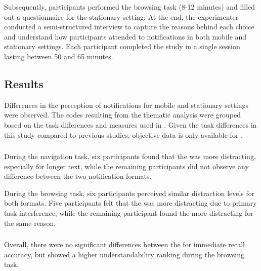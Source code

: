 Subsequently, participants performed the browsing task (8-12 minutes) and filled out a questionnaire for the stationary setting. At the end, the experimenter conducted a semi-structured interview to capture the reasons behind each choice and understand how participants attended to notifications in both mobile and stationary settings. Each participant completed the study in a single session lasting between 50 and 65 minutes.


\subsection{Results}
\label{sec:IconNotif:study4:results}

Differences in the perception of notifications for mobile and stationary settings were observed. The codes resulting from the thematic analysis were grouped based on the task differences and measures used in \studythree{}. Given the task differences in this study compared to previous studies, objective data is only available for \Comprehension{}.


\subsubsection*{\Interruption{}}
\label{sec:IconNotif:study4:interruption_parameter}

During the navigation task, six participants found that the \textformat{} was more distracting, especially for longer text, while the remaining participants did not observe any difference between the two notification formats.

During the browsing task, six participants perceived similar distraction levels for both formats. Five participants felt that the \textformat{} was more distracting due to primary task interference, while the remaining participant found the \iconformat{} more distracting for the same reason.

\subsubsection*{\Comprehension{}}
\label{sec:IconNotif:study4:comprehension_parameter}

Overall, there were no significant differences between the  for immediate recall accuracy,  but \textformat{} showed a higher understandability ranking during the browsing task. 

